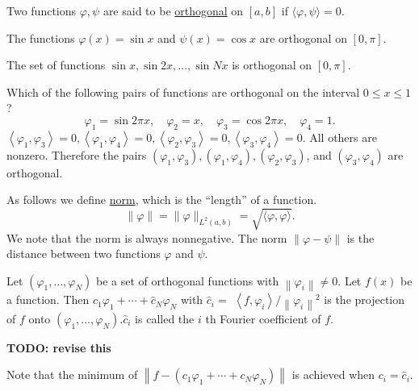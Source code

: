 \begin{definition}[Orthogonality]
Two functions $\varphi, \psi$ are said to be \underline{orthogonal} on $[a, b]$ if $\langle\varphi, \psi\rangle=0$.    
\end{definition}

\begin{example}[]
    The functions $\varphi(x)=\sin x$ and $\psi(x)=\cos x$ are orthogonal on $[0, \pi]$.
\end{example}
\begin{example}[]
    The set of functions $\sin x, \sin 2 x, \ldots, \sin N x$ is orthogonal on $[0, \pi]$.
\end{example}
\begin{example}[]
    Which of the following pairs of functions are orthogonal on the interval $0 \leq x \leq 1$ ?
$$
\varphi_1=\sin 2 \pi x, \quad \varphi_2=x, \quad \varphi_3=\cos 2 \pi x, \quad \varphi_4=1 .
$$
$\left\langle\varphi_1, \varphi_3\right\rangle=0,\left\langle\varphi_1, \varphi_4\right\rangle=0,\left\langle\varphi_2, \varphi_3\right\rangle=0,\left\langle\varphi_3, \varphi_4\right\rangle=0$. All others are nonzero. Therefore the pairs $\left(\varphi_1, \varphi_3\right),\left(\varphi_1, \varphi_4\right),\left(\varphi_2, \varphi_3\right)$, and $\left(\varphi_3, \varphi_4\right)$ are orthogonal.
\end{example}

\begin{definition}[Norm]
As follows we define \underline{norm}, which is the ``length'' of a function.
$$
\|\varphi\|=\|\varphi\|_{L^2(a, b)}=\sqrt{\langle\varphi, \varphi\rangle} .
$$
We note that the norm is always nonnegative. The norm $\|\varphi-\psi\|$ is the distance between two functions $\varphi$ and $\psi$.
\end{definition}

\begin{definition}[Projection]
    Let $\left(\varphi_1, \ldots, \varphi_N\right)$ be a set of orthogonal functions with $\left\|\varphi_i\right\| \neq 0$. Let $f(x)$ be a function. Then $\hat{c}_1 \varphi_1+\cdots+\hat{c}_N \varphi_N$ with $\hat{c}_i=$ $\left\langle f, \varphi_i\right\rangle /\left\|\varphi_i\right\|^2$ is the projection of $f$ onto $\left(\varphi_1, \ldots, \varphi_N\right) . \hat{c}_i$ is called the $i$ th Fourier coefficient of $f$. 

    \textbf{TODO: revise this}
\end{definition}


Note that the minimum of $\left\|f-\left(c_1 \varphi_1+\cdots+c_N \varphi_N\right)\right\|$ is achieved when $c_i=\hat{c}_i$.
    
